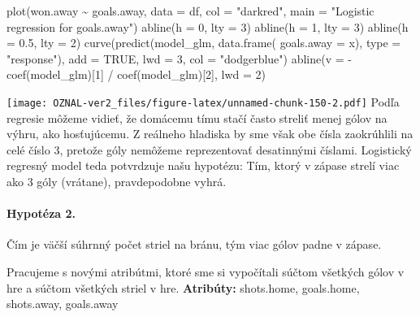 \documentclass[
]{article}
\newenvironment{Shaded}{\begin{snugshade}}{\end{snugshade}}
\newcommand{\AttributeTok}[1]{\textcolor[rgb]{0.77,0.63,0.00}{#1}}
\newcommand{\ConstantTok}[1]{\textcolor[rgb]{0.00,0.00,0.00}{#1}}
\newcommand{\DecValTok}[1]{\textcolor[rgb]{0.00,0.00,0.81}{#1}}
\newcommand{\FloatTok}[1]{\textcolor[rgb]{0.00,0.00,0.81}{#1}}
\newcommand{\FunctionTok}[1]{\textcolor[rgb]{0.00,0.00,0.00}{#1}}
\newcommand{\NormalTok}[1]{#1}
\newcommand{\SpecialCharTok}[1]{\textcolor[rgb]{0.00,0.00,0.00}{#1}}
\newcommand{\StringTok}[1]{\textcolor[rgb]{0.31,0.60,0.02}{#1}}
\begin{document}
\begin{Shaded}
\begin{Highlighting}[]
\FunctionTok{plot}\NormalTok{(won.away }\SpecialCharTok{\textasciitilde{}}\NormalTok{ goals.away, }\AttributeTok{data =}\NormalTok{ df, }
     \AttributeTok{col =} \StringTok{"darkred"}\NormalTok{,}
     \AttributeTok{main =} \StringTok{"Logistic regression for goals.away"}\NormalTok{)}
\FunctionTok{abline}\NormalTok{(}\AttributeTok{h =} \DecValTok{0}\NormalTok{, }\AttributeTok{lty =} \DecValTok{3}\NormalTok{)}
\FunctionTok{abline}\NormalTok{(}\AttributeTok{h =} \DecValTok{1}\NormalTok{, }\AttributeTok{lty =} \DecValTok{3}\NormalTok{)}
\FunctionTok{abline}\NormalTok{(}\AttributeTok{h =} \FloatTok{0.5}\NormalTok{, }\AttributeTok{lty =} \DecValTok{2}\NormalTok{)}
\FunctionTok{curve}\NormalTok{(}\FunctionTok{predict}\NormalTok{(model\_glm, }\FunctionTok{data.frame}\NormalTok{( }\AttributeTok{goals.away =}\NormalTok{ x), }\AttributeTok{type =} \StringTok{"response"}\NormalTok{), }\AttributeTok{add =} \ConstantTok{TRUE}\NormalTok{, }\AttributeTok{lwd =} \DecValTok{3}\NormalTok{, }\AttributeTok{col =} \StringTok{"dodgerblue"}\NormalTok{)}
\FunctionTok{abline}\NormalTok{(}\AttributeTok{v =} \SpecialCharTok{{-}}\FunctionTok{coef}\NormalTok{(model\_glm)[}\DecValTok{1}\NormalTok{] }\SpecialCharTok{/} \FunctionTok{coef}\NormalTok{(model\_glm)[}\DecValTok{2}\NormalTok{], }\AttributeTok{lwd =} \DecValTok{2}\NormalTok{)}
\end{Highlighting}
\end{Shaded}

\texttt{[image: OZNAL-ver2\_files/figure-latex/unnamed-chunk-150-2.pdf]}
Podľa regresie môžeme vidieť, že domácemu tímu stačí často streliť menej
gólov na výhru, ako hosťujúcemu. Z reálneho hladiska by sme však obe
čísla zaokrúhlili na celé číslo 3, pretože góly nemôžeme reprezentovať
desatinnými číslami. Logistický regresný model teda potvrdzuje našu
hypotézu: Tím, ktorý v zápase strelí viac ako 3 góly (vrátane),
pravdepodobne vyhrá.

\hypertarget{hypotuxe9za-2.}{%
\paragraph{Hypotéza 2.}\label{hypotuxe9za-2.}}

Čím je väčší súhrnný počet striel na bránu, tým viac gólov padne v
zápase.

Pracujeme s novými atribútmi, ktoré sme si vypočítali súčtom všetkých
gólov v hre a súčtom všetkých striel v hre. \textbf{Atribúty:}
shots.home, goals.home, shots.away, goals.away
\end{document}
